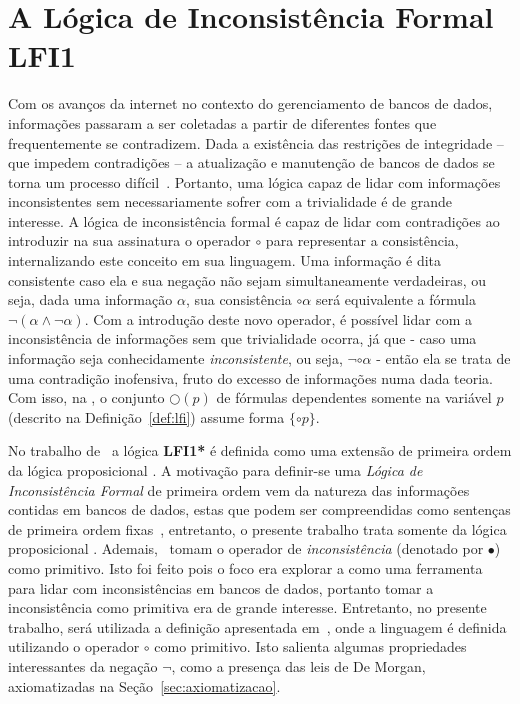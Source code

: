 \chapter{A Lógica de Inconsistência Formal LFI1}\label{cap:LFI1}

Com os avanços da internet no contexto do gerenciamento de bancos de dados, informações passaram a ser coletadas a partir de diferentes fontes que frequentemente se contradizem. Dada a existência das restrições de integridade {--} que impedem contradições {--} a atualização e manutenção de bancos de dados se torna um processo difícil~\cite{carnielli2000formal}. Portanto, uma lógica capaz de lidar com informações inconsistentes sem necessariamente sofrer com a trivialidade é de grande interesse. A lógica de inconsistência formal \lfium{} é capaz de lidar com contradições ao introduzir na sua assinatura o operador $\circ$ para representar a consistência, internalizando este conceito em sua linguagem. Uma informação é dita consistente caso ela e sua negação não sejam simultaneamente verdadeiras, ou seja, dada uma informação $\alpha$, sua consistência $\circ \alpha$ será equivalente a fórmula $\neg (\alpha \land \neg \alpha)$. Com a introdução deste novo operador, é possível lidar com a inconsistência de informações sem que trivialidade ocorra, já que {-} caso uma informação seja conhecidamente \textit{inconsistente}, ou seja, $\neg \circ \alpha$ {-} então ela se trata de uma contradição inofensiva, fruto do excesso de informações numa dada teoria. Com isso, na \lfium{}, o conjunto $\bigcirc(p)$ de fórmulas dependentes somente na variável $p$ (descrito na Definição~\ref{def:lfi}) assume forma $\{\circ p\}$.


No trabalho de~ a lógica \textbf{LFI1*} é definida como uma extensão de primeira ordem da lógica proposicional \lfium{}. A motivação para definir-se uma \textit{Lógica de Inconsistência Formal} de primeira ordem vem da natureza das informações contidas em bancos de dados, estas que podem ser compreendidas como sentenças de primeira ordem fixas~\cite{Codd}, entretanto, o presente trabalho trata somente da lógica proposicional \lfium{}. Ademais,~ tomam o operador de \textit{inconsistência} (denotado por $\bullet$) como primitivo. Isto foi feito pois o foco era explorar a \lfium{} como uma ferramenta para lidar com inconsistências em bancos de dados, portanto tomar a inconsistência como primitiva era de grande interesse. Entretanto, no presente trabalho, será utilizada a definição apresentada em~, onde a linguagem é definida utilizando o operador $\circ$ como primitivo. Isto salienta algumas propriedades interessantes da negação $\neg$, como a presença das leis de De Morgan, axiomatizadas na Seção~\ref{sec:axiomatizacao}.

